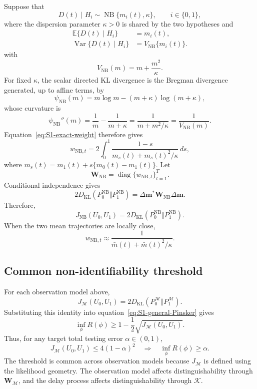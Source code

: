 Suppose that
\[
D(t)\mid H_i
\sim
\operatorname{NB}\{m_i(t),\kappa\},
\qquad i\in\{0,1\},
\]
where the dispersion parameter \(\kappa>0\) is shared by the two hypotheses and
\[
\begin{aligned}
\mathbb E\{D(t)\mid H_i\}
&=m_i(t),\\
\operatorname{Var}\{D(t)\mid H_i\}
&= V_{\mathrm{NB}}\{m_i(t)\}.
\end{aligned}
\]
with
\begin{equation}
V_{\mathrm{NB}}(m)=m+\frac{m^2}{\kappa}.
\label{eq:S1-NB-variance-function}
\end{equation}
For fixed \(\kappa\), the scalar directed KL divergence is the Bregman divergence generated, up to affine terms, by
\[
\psi_{\mathrm{NB}}(m)
= m\log m-(m+\kappa)\log(m+\kappa),
\]
whose curvature is
\[
\psi_{\mathrm{NB}}''(m)
=
\frac{1}{m}-\frac{1}{m+\kappa}
=
\frac{1}{m+m^2/\kappa}
=
\frac{1}{V_{\mathrm{NB}}(m)}.
\]
Equation~\eqref{eq:S1-exact-weight} therefore gives
\begin{equation}
w_{\mathrm{NB},t}
=
2\int_0^1
\frac{1-s}
{m_s(t)+m_s(t)^2/\kappa}
\,ds,
\label{eq:S1-NB-weight}
\end{equation}
where \(m_s(t)=m_1(t)+s\{m_0(t)-m_1(t)\}\). Let
\[
\mathbf W_{\mathrm{NB}}
=
\operatorname{diag}\{w_{\mathrm{NB},t}\}_{t=1}^T .
\]
Conditional independence gives
\begin{equation}
2D_{\mathrm{KL}}(P_0^{\mathrm{NB}}\Vert P_1^{\mathrm{NB}})
=
\Delta\mathbf m^*
\mathbf W_{\mathrm{NB}}
\Delta\mathbf m.
\label{eq:S1-NB-KL-weighted}
\end{equation}
Therefore,
\[
J_{\mathrm{NB}}(U_0,U_1) = 2D_{\mathrm{KL}}(P_0^{\mathrm{NB}}\Vert P_1^{\mathrm{NB}}).
\]
When the two mean trajectories are locally close,
\[
w_{\mathrm{NB},t}
\approx
\frac{1}{\bar m(t)+\bar m(t)^2/\kappa}.
\]

\subsection{Common non-identifiability threshold}

For each observation model above,
\[
J_{\mathcal M}(U_0,U_1) = 2D_{\mathrm{KL}}
\left(
P_0^{\mathcal M}\Vert P_1^{\mathcal M}
\right).
\]
Substituting this identity into equation~\eqref{eq:S1-general-Pinsker} gives
\begin{equation}
\inf_\phi R(\phi)
\ge
1-\frac12\sqrt{J_{\mathcal M}(U_0,U_1)}.
\label{eq:S1-common-testing-bound}
\end{equation}
Thus, for any target total testing error \(\alpha\in(0,1)\),
\begin{equation}
J_{\mathcal M}(U_0,U_1)
\le
4(1-\alpha)^2
\quad\Longrightarrow\quad
\inf_\phi R(\phi)\ge \alpha .
\label{eq:S1-common-threshold}
\end{equation}
The threshold is common across observation models because \(J_{\mathcal M}\) is defined using the likelihood geometry. The observation model affects distinguishability through \(\mathbf W_{\mathcal M}\), and the delay process affects distinguishability through \(\mathcal K\).
